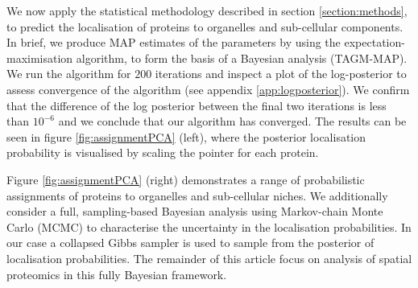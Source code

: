\documentclass[12pt,english]{article}\usepackage[]{graphicx}\usepackage[]{color}
\begin{document}
We now apply the statistical methodology described in section
\ref{section:methods}, to predict the localisation of proteins to
organelles and sub-cellular components. In brief, we produce MAP
estimates of the parameters by using the expectation-maximisation
algorithm, to form the basis of a Bayesian analysis (TAGM-MAP).  We
run the algorithm for $200$ iterations and inspect a plot of the
log-posterior to assess convergence of the algorithm (see appendix
\ref{app:logposterior}). We confirm that the difference of the log
posterior between the final two iterations is less than $10^{-6}$ and
we conclude that our algorithm has converged. The results can be seen
in figure \ref{fig:assignmentPCA} (left), where the posterior localisation
probability is visualised by scaling the pointer for each protein.

Figure \ref{fig:assignmentPCA} (right) demonstrates a range of
probabilistic assignments of proteins to organelles and sub-cellular
niches. We additionally consider a full, sampling-based Bayesian
analysis using Markov-chain Monte Carlo (MCMC) to characterise the
uncertainty in the localisation probabilities.  In our case a
collapsed Gibbs sampler is used to sample from the posterior of
localisation probabilities. The remainder of this article focus on
analysis of spatial proteomics in this fully Bayesian framework.
\end{document}
